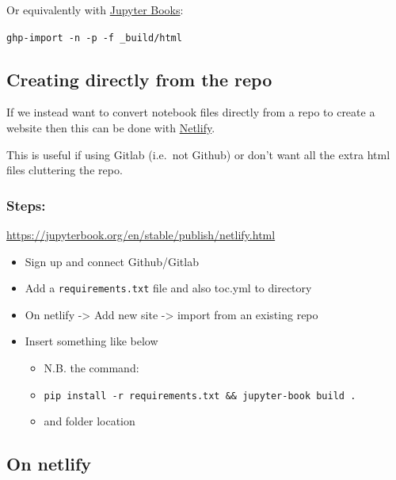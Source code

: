 \documentclass[
  letterpaper,
  DIV=11,
  numbers=noendperiod]{scrartcl}
\providecommand{\tightlist}{%
  \setlength{\itemsep}{0pt}\setlength{\parskip}{0pt}}\usepackage{longtable,booktabs,array}
\begin{document}
Or equivalently with
\href{https://jupyterbook.org/en/stable/publish/gh-pages.html}{Jupyter
Books}:

\texttt{ghp-import\ -n\ -p\ -f\ \_build/html}

\hypertarget{creating-directly-from-the-repo}{%
\subsection{Creating directly from the
repo}\label{creating-directly-from-the-repo}}

If we instead want to convert notebook files directly from a repo to
create a website then this can be done with
\href{https://docs.netlify.com/}{Netlify}.

This is useful if using Gitlab (i.e.~not Github) or don't want all the
extra html files cluttering the repo.

\hypertarget{steps}{%
\subsubsection{Steps:}\label{steps}}

\url{https://jupyterbook.org/en/stable/publish/netlify.html}

\begin{itemize}
\tightlist
\item
  Sign up and connect Github/Gitlab
\item
  Add a \texttt{requirements.txt} file and also toc.yml to directory
\item
  On netlify -\textgreater{} Add new site -\textgreater{} import from an
  existing repo
\item
  Insert something like below

  \begin{itemize}
  \tightlist
  \item
    N.B. the command:
  \item
    \texttt{pip\ install\ -r\ requirements.txt\ \&\&\ jupyter-book\ build\ .}
  \item
    and folder location
  \end{itemize}
\end{itemize}

\hypertarget{on-netlify}{%
\subsection{On netlify}\label{on-netlify}}
\end{document}
